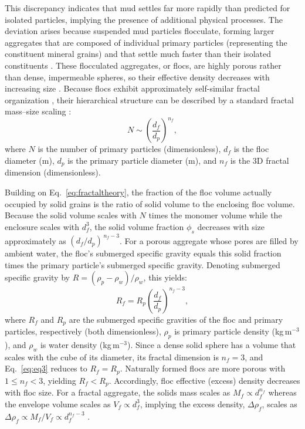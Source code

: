 \documentclass{agujournal2019}
\begin{document}
This discrepancy indicates that mud settles far more rapidly than predicted for isolated particles, implying the presence of additional physical processes. The deviation arises because suspended mud particles flocculate, forming larger aggregates that are composed of individual primary particles (representing the constituent mineral grains) and that settle much faster than their isolated constituents \cite{droppo1997freshwater, johnson1996settling, kranenburg1994fractal}. These flocculated aggregates, or flocs, are highly porous rather than dense, impermeable spheres, so their effective density decreases with increasing size \cite{kranenburg1994fractal, Meakin1992Aggregation}. Because flocs exhibit approximately self-similar fractal organization \cite{family2012kinetics, jullien1987aggregation}, their hierarchical structure can be described by a standard fractal mass--size scaling \cite{Meakin1992Aggregation}:
\begin{equation}
N \sim \left( \frac{d_f}{d_p} \right)^{n_f},
    \label{eq:fractaltheory}
\end{equation}
where $N$ is the number of primary particles (dimensionless), $d_f$ is the floc diameter (m), $d_p$ is the primary particle diameter (m), and $n_f$ is the 3D fractal dimension (dimensionless).

Building on Eq.~\eqref{eq:fractaltheory}, the fraction of the floc volume actually occupied by solid grains is the ratio of solid volume to the enclosing floc volume. Because the solid volume scales with $N$ times the monomer volume while the enclosure scales with $d_f^{3}$, the solid volume fraction $\phi_s$ decreases with size approximately as $(d_f/d_p)^{\,n_f-3}$. For a porous aggregate whose pores are filled by ambient water, the floc's submerged specific gravity equals this solid fraction times the primary particle's submerged specific gravity. Denoting submerged specific gravity by $R=(\rho_p-\rho_w)/\rho_w$, this yields:
\begin{equation}
R_f = R_p \left( \frac{d_f}{d_p} \right)^{n_f - 3},
    \label{eq:eq3}
\end{equation}
where $R_f$ and $R_p$ are the submerged specific gravities of the floc and primary particles, respectively (both dimensionless), $\rho_p$ is primary particle density (kg\,m$^{-3}$), and $\rho_w$ is water density (kg\,m$^{-3}$). Since a dense solid sphere has a volume that scales with the cube of its diameter, its fractal dimension is $n_f=3$, and Eq.~\eqref{eq:eq3} reduces to $R_f=R_p$. Naturally formed flocs are more porous with $1 \le n_f < 3$, yielding $R_f<R_p$. Accordingly, floc effective (excess) density decreases with floc size. For a fractal aggregate, the solids mass scales as $M_f \propto d_f^{n_f}$ whereas the envelope volume scales as $V_f \propto d_f^{3}$, implying the excess density, $\Delta \rho_f$, scales as $\Delta \rho_f \propto M_f / V_f \propto d_f^{n_f-3}$ \cite{kranenburg1994fractal}.
\end{document}
